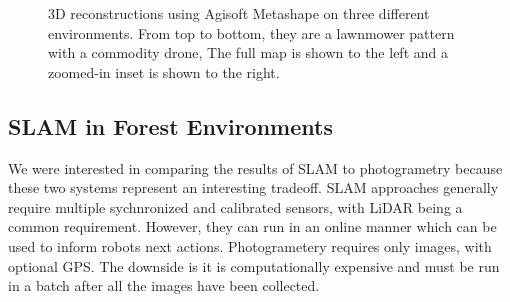\begin{figure}[h]
    \hfill
    \caption{3D reconstructions using Agisoft Metashape on three different environments. From top to bottom, they are a lawnmower pattern with a commodity drone,  The full map is shown to the left and a zoomed-in inset is shown to the right.}
    \label{fig:results:sfm}
\end{figure}


\subsection{SLAM in Forest Environments}
We were interested in comparing the results of SLAM to photogrametry because these two systems represent an interesting tradeoff. SLAM approaches generally require multiple sychnronized and calibrated sensors, with LiDAR being a common requirement. However, they can run in an online manner which can be used to inform robots next actions. Photogrametery requires only images, with optional GPS. The downside is it is computationally expensive and must be run in a batch after all the images have been collected.

